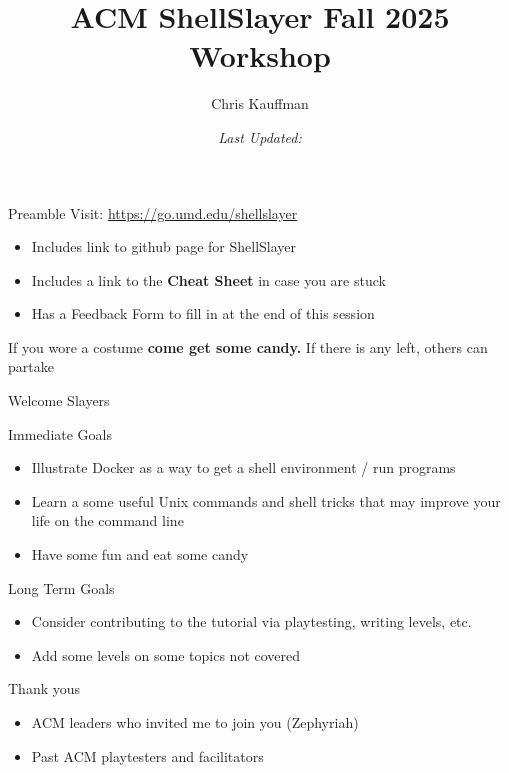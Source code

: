 \documentclass[mathserif]{beamer}
\author{Chris Kauffman}
\date{\it Last Updated: \newline }
\title{ACM ShellSlayer Fall 2025 Workshop}
\begin{document}
\maketitle
\begin{frame}[label={sec:org20d63b9}]{Preamble}
Visit: \url{https://go.umd.edu/shellslayer}
\begin{itemize}
\item Includes link to github page for ShellSlayer
\item Includes a link to the \textbf{Cheat Sheet} in case you are stuck
\item Has a Feedback Form to fill in at the end of this session
\end{itemize}

If you wore a costume \textbf{come get some candy.}  If there is any left,
others can partake
\end{frame}
\begin{frame}[label={sec:orgf53d7b4}]{Welcome Slayers}
\begin{block}{Immediate Goals}
\begin{itemize}
\item Illustrate Docker as a way to get a shell environment / run programs
\item Learn a some useful Unix commands and shell tricks that may improve
your life on the command line
\item Have some fun and eat some candy
\end{itemize}
\end{block}
\begin{block}{Long Term Goals}
\begin{itemize}
\item Consider contributing to the tutorial via playtesting, writing
levels, etc.
\item Add some levels on some topics not covered
\end{itemize}
\end{block}
\begin{block}{Thank yous}
\begin{itemize}
\item ACM leaders who invited me to join you (Zephyriah)
\item Past ACM playtesters and facilitators
\end{itemize}
\end{block}
\end{frame}
\end{document}
